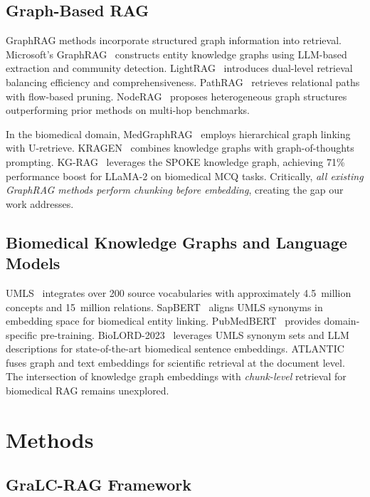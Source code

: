\documentclass[sn-basic]{sn-jnl}
\newcommand{\gralcrag}{GraLC-RAG}
\begin{document}
\subsection{Graph-Based RAG}

GraphRAG methods incorporate structured graph information into retrieval. Microsoft's GraphRAG~\cite{edge2024local} constructs entity knowledge graphs using LLM-based extraction and community detection. LightRAG~\cite{guo2024lightrag} introduces dual-level retrieval balancing efficiency and comprehensiveness. PathRAG~\cite{chen2025pathrag} retrieves relational paths with flow-based pruning. NodeRAG~\cite{xu2025noderag} proposes heterogeneous graph structures outperforming prior methods on multi-hop benchmarks.

In the biomedical domain, MedGraphRAG~\cite{wu2024medgraphrag} employs hierarchical graph linking with U-retrieve. KRAGEN~\cite{matsumoto2024kragen} combines knowledge graphs with graph-of-thoughts prompting. KG-RAG~\cite{soman2024biomedical} leverages the SPOKE knowledge graph, achieving 71\% performance boost for LLaMA-2 on biomedical MCQ tasks. Critically, \emph{all existing GraphRAG methods perform chunking before embedding}, creating the gap our work addresses.

\subsection{Biomedical Knowledge Graphs and Language Models}

UMLS~\cite{bodenreider2004umls} integrates over 200 source vocabularies with approximately 4.5~million concepts and 15~million relations. SapBERT~\cite{liu2021self} aligns UMLS synonyms in embedding space for biomedical entity linking. PubMedBERT~\cite{gu2021domain} provides domain-specific pre-training. BioLORD-2023~\cite{remy2023biolord} leverages UMLS synonym sets and LLM descriptions for state-of-the-art biomedical sentence embeddings. ATLANTIC~\cite{munikoti2023atlantic} fuses graph and text embeddings for scientific retrieval at the document level. The intersection of knowledge graph embeddings with \emph{chunk-level} retrieval for biomedical RAG remains unexplored.

\section{Methods}\label{sec:methods}

\subsection{\gralcrag{} Framework}\label{sec:framework}
\end{document}
